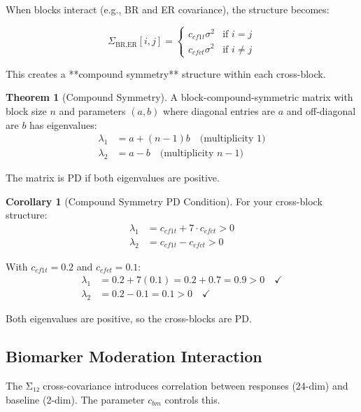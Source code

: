 \documentclass[12pt,a4paper]{article}
\theoremstyle{definition}
\newtheorem{theorem}{Theorem}
\newtheorem{corollary}{Corollary}
\begin{document}
When blocks interact (e.g., BR and ER covariance), the structure becomes:

\[
  \Sigma_{\text{BR,ER}}[i,j] = \begin{cases}
    c_{cf1t} \sigma^2 & \text{if } i = j \\
    c_{cfct} \sigma^2 & \text{if } i \neq j
  \end{cases}
\]

This creates a **compound symmetry** structure within each cross-block.

\begin{theorem}[Compound Symmetry]
A block-compound-symmetric matrix with block size $n$ and parameters $(a, b)$ where diagonal entries are $a$ and off-diagonal are $b$ has eigenvalues:
\begin{align*}
  \lambda_1 &= a + (n-1)b \quad \text{(multiplicity 1)} \\
  \lambda_2 &= a - b \quad \text{(multiplicity } n-1)
\end{align*}

The matrix is PD if both eigenvalues are positive.
\end{theorem}

\begin{corollary}[Compound Symmetry PD Condition]
For your cross-block structure:
\begin{align*}
  \lambda_1 &= c_{cf1t} + 7 \cdot c_{cfct} > 0 \\
  \lambda_2 &= c_{cf1t} - c_{cfct} > 0
\end{align*}

With $c_{cf1t} = 0.2$ and $c_{cfct} = 0.1$:
\begin{align*}
  \lambda_1 &= 0.2 + 7(0.1) = 0.2 + 0.7 = 0.9 > 0 \quad ✓ \\
  \lambda_2 &= 0.2 - 0.1 = 0.1 > 0 \quad ✓
\end{align*}

Both eigenvalues are positive, so the cross-blocks are PD.
\end{corollary}

\subsection{Biomarker Moderation Interaction}

The Σ₁₂ cross-covariance introduces correlation between responses (24-dim) and baseline (2-dim). The parameter $c_{bm}$ controls this.
\end{document}
